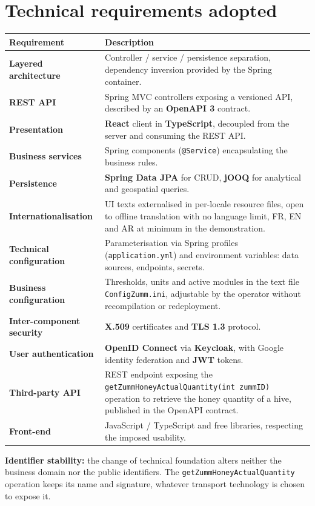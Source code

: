 \section{Technical requirements adopted}
\begin{xltabular}{\textwidth}{>{\bfseries}p{4cm} X}
\toprule
\textbf{Requirement} & \textbf{Description} \\
\midrule
\endhead
Layered architecture & Controller / service / persistence separation, dependency inversion provided by the Spring container. \\
REST API & Spring MVC controllers exposing a versioned API, described by an \textbf{OpenAPI 3} contract. \\
Presentation & \textbf{React} client in \textbf{TypeScript}, decoupled from the server and consuming the REST API. \\
Business services & Spring components (\texttt{@Service}) encapsulating the business rules. \\
Persistence & \textbf{Spring Data JPA} for CRUD, \textbf{jOOQ} for analytical and geospatial queries. \\
Internationalisation & UI texts externalised in per-locale resource files, open to offline translation with no language limit, FR, EN and AR at minimum in the demonstration. \\
Technical configuration & Parameterisation via Spring profiles (\texttt{application.yml}) and environment variables: data sources, endpoints, secrets. \\
Business configuration & Thresholds, units and active modules in the text file \texttt{ConfigZumm.ini}, adjustable by the operator without recompilation or redeployment. \\
Inter-component security & \textbf{X.509} certificates and \textbf{TLS 1.3} protocol. \\
User authentication & \textbf{OpenID Connect} via \textbf{Keycloak}, with Google identity federation and \textbf{JWT} tokens. \\
Third-party API  & REST endpoint exposing the \texttt{getZummHoneyActualQuantity(int zummID)} operation to retrieve the honey quantity of a hive, published in the OpenAPI contract. \\
Front-end        & JavaScript / TypeScript and free libraries, respecting the imposed usability. \\
\bottomrule
\end{xltabular}

\begin{encadre}
\textbf{Identifier stability:} the change of technical foundation alters neither
the business domain nor the public identifiers. The
\texttt{getZummHoneyActualQuantity} operation keeps its name and signature,
whatever transport technology is chosen to expose it.
\end{encadre}

